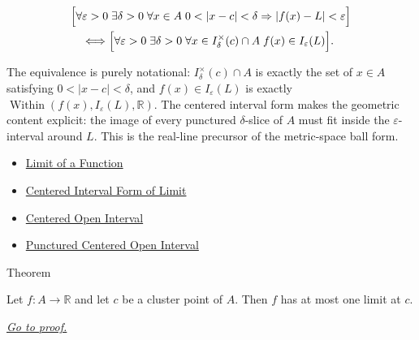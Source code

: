 \begin{remark*}
\[
\begin{aligned}
&\Bigl[\forall\varepsilon>0\;\exists\delta>0\;\forall x\in A\;
  0<|x-c|<\delta\Rightarrow |f(x)-L|<\varepsilon\Bigr] \\
&\quad\Longleftrightarrow
\Bigl[\forall\varepsilon>0\;\exists\delta>0\;\forall x\in I_\delta^\times(c)\cap A\;
  f(x)\in I_\varepsilon(L)\Bigr].
\end{aligned}
\]
\end{remark*}

\begin{remark*}[Interpretation]
The equivalence is purely notational: $I_\delta^\times(c) \cap A$ is
exactly the set of $x \in A$ satisfying
$0<|x-c|<\delta$, and $f(x) \in
I_\varepsilon(L)$ is exactly
$\operatorname{Within}(f(x),I_\varepsilon(L),\mathbb R)$. The centered
interval form makes the geometric content explicit: the image of every
punctured $\delta$-slice of $A$ must fit inside the $\varepsilon$-interval
around $L$. This is the real-line precursor of the metric-space ball form.
\end{remark*}

\begin{dependencies}
\begin{itemize}
  \item \hyperref[def:limit-function]{Limit of a Function}
  \item \hyperref[def:limit-function-neighbourhood]{Centered Interval Form of Limit}
  \item \hyperref[def:epsilon-neighbourhood]{Centered Open Interval}
  \item \hyperref[def:deleted-epsilon-neighbourhood]{Punctured Centered Open Interval}
\end{itemize}
\end{dependencies}


\begin{theorembox}{Theorem}
\begin{theorem}
\label{thm:limit-unique}
Let $f : A \to \mathbb{R}$ and let $c$ be a cluster point of $A$.
Then $f$ has at most one limit at $c$.

\smallskip\noindent
\hyperref[prf:limit-unique]{\textit{Go to proof.}}
\end{theorem}
\end{theorembox}

